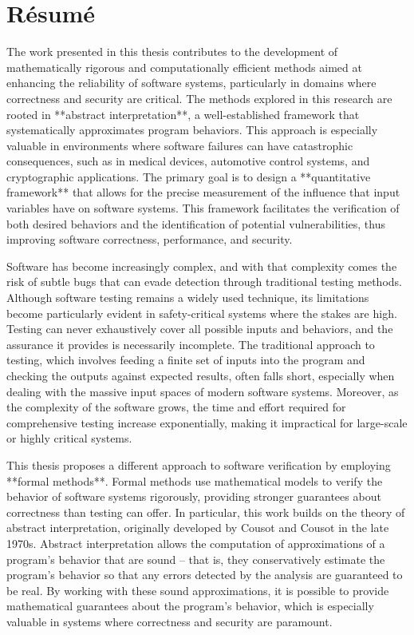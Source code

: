 

\chapter*{Résumé}{\em

The work presented in this thesis contributes to the development of mathematically rigorous and computationally efficient methods aimed at enhancing the reliability of software systems, particularly in domains where correctness and security are critical. The methods explored in this research are rooted in **abstract interpretation**, a well-established framework that systematically approximates program behaviors. This approach is especially valuable in environments where software failures can have catastrophic consequences, such as in medical devices, automotive control systems, and cryptographic applications. The primary goal is to design a **quantitative framework** that allows for the precise measurement of the influence that input variables have on software systems. This framework facilitates the verification of both desired behaviors and the identification of potential vulnerabilities, thus improving software correctness, performance, and security.

Software has become increasingly complex, and with that complexity comes the risk of subtle bugs that can evade detection through traditional testing methods. Although software testing remains a widely used technique, its limitations become particularly evident in safety-critical systems where the stakes are high. Testing can never exhaustively cover all possible inputs and behaviors, and the assurance it provides is necessarily incomplete. The traditional approach to testing, which involves feeding a finite set of inputs into the program and checking the outputs against expected results, often falls short, especially when dealing with the massive input spaces of modern software systems. Moreover, as the complexity of the software grows, the time and effort required for comprehensive testing increase exponentially, making it impractical for large-scale or highly critical systems.

This thesis proposes a different approach to software verification by employing **formal methods**. Formal methods use mathematical models to verify the behavior of software systems rigorously, providing stronger guarantees about correctness than testing can offer. In particular, this work builds on the theory of abstract interpretation, originally developed by Cousot and Cousot in the late 1970s. Abstract interpretation allows the computation of approximations of a program’s behavior that are sound -- that is, they conservatively estimate the program’s behavior so that any errors detected by the analysis are guaranteed to be real. By working with these sound approximations, it is possible to provide mathematical guarantees about the program's behavior, which is especially valuable in systems where correctness and security are paramount.

}
